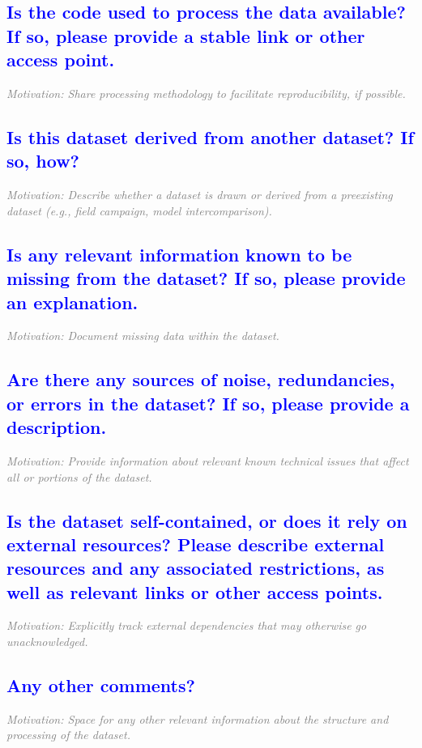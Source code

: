\documentclass[letterpaper, 10 pt, transmag]{IEEEtran}
\begin{document}
\textcolor{blue}{\subsection{Is the code used to process the data available? If so, please provide a stable link or other access point.}}
\textcolor{gray}{\textit{Motivation: Share processing methodology to facilitate reproducibility, if possible.}}

\textcolor{blue}{\subsection{Is this dataset derived from another dataset? If so, how?}} 
\textcolor{gray}{\textit{Motivation: Describe whether a dataset is drawn or derived from a preexisting dataset (e.g., field campaign, model intercomparison).}}

\textcolor{blue}{\subsection{Is any relevant information known to be missing from the dataset? If so, please provide an explanation.}}
\textcolor{gray}{\textit{Motivation: Document missing data within the dataset.}}

\textcolor{blue}{\subsection{Are there any sources of noise, redundancies, or errors in the dataset? If so, please provide a description.}}
\textcolor{gray}{\textit{Motivation: Provide information about relevant known technical issues that affect all or portions of the dataset.}}

\textcolor{blue}{\subsection{Is the dataset self-contained, or does it rely on external resources? Please describe external resources and any associated restrictions, as well as relevant links or other access points.}}
\textcolor{gray}{\textit{Motivation: Explicitly track external dependencies that may otherwise go unacknowledged.}}

\textcolor{blue}{\subsection{Any other comments?}}
\textcolor{gray}{\textit{Motivation: Space for any other relevant information about the structure and processing of the dataset.}}  
\vspace{10mm}
\end{document}
